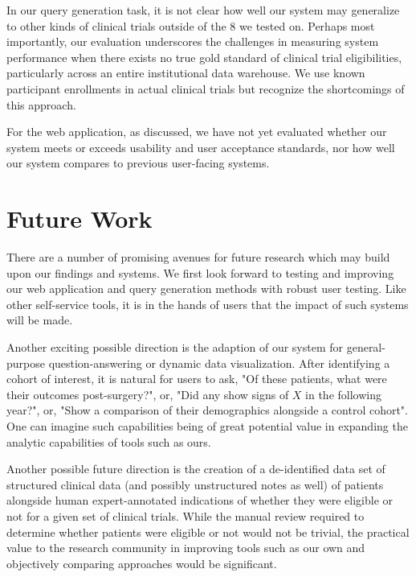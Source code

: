 \documentclass[../main.tex]{subfiles}
\begin{document}
In our query generation task, it is not clear how well our system may generalize to other kinds of clinical trials outside of the 8 we tested on. Perhaps most importantly, our evaluation underscores the challenges in measuring system performance when there exists no true gold standard of clinical trial eligibilities, particularly across an entire institutional data warehouse. We use known participant enrollments in actual clinical trials but recognize the shortcomings of this approach.

For the web application, as discussed, we have not yet evaluated whether our system meets or exceeds usability and user acceptance standards, nor how well our system compares to previous user-facing systems. 

\section{Future Work}

There are a number of promising avenues for future research which may build upon our findings and systems. We first look forward to testing and improving our web application and query generation methods with robust user testing. Like other self-service tools, it is in the hands of users that the impact of such systems will be made.

Another exciting possible direction is the adaption of our system for general-purpose question-answering or dynamic data visualization. After identifying a cohort of interest, it is natural for users to ask, "Of these patients, what were their outcomes post-surgery?", or, "Did any show signs of $X$ in the following year?", or, "Show a comparison of their demographics alongside a control cohort". One can imagine such capabilities being of great potential value in expanding the analytic capabilities of tools such as ours.

Another possible future direction is the creation of a de-identified data set of structured clinical data (and possibly unstructured notes as well) of patients alongside human expert-annotated indications of whether they were eligible or not for a given set of clinical trials. While the manual review required to determine whether patients were eligible or not would not be trivial, the practical value to the research community in improving tools such as our own and objectively comparing approaches would be significant.
\end{document}
